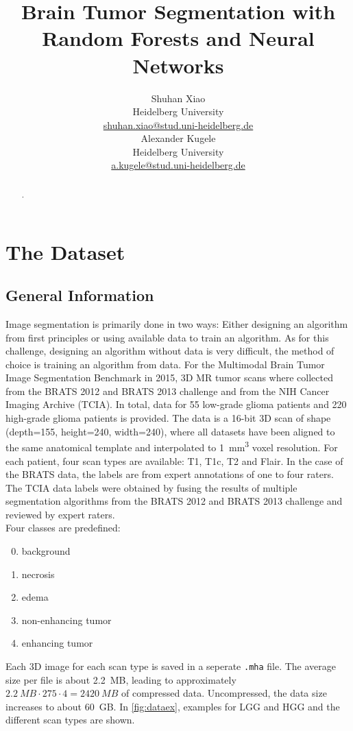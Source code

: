 \documentclass[final]{article}
\title{Brain Tumor Segmentation with Random Forests and Neural Networks}
\author{
  Shuhan Xiao \\
  Heidelberg University \\
  \href{mailto:shuhan.xiao@stud.uni-heidelberg.de}{shuhan.xiao@stud.uni-heidelberg.de}\\
  \And
  Alexander Kugele \\
  Heidelberg University \\
  \href{mailto:a.kugele@stud.uni-heidelberg.de}{a.kugele@stud.uni-heidelberg.de}\\
}
\begin{document}
\maketitle

\begin{abstract}
.
\end{abstract}

\section{The Dataset}

\subsection{General Information}
Image segmentation is primarily done in two ways: Either designing an algorithm
from first principles or using available data to train an algorithm. As for
this challenge, designing an algorithm without data is very difficult, the
method of choice is training an algorithm from data. For the Multimodal Brain
Tumor Image Segmentation Benchmark \citep{BRATS} in 2015, 3D MR tumor scans
where collected from the BRATS 2012 and BRATS 2013 challenge and from the NIH
Cancer Imaging Archive (TCIA). In total, data for 55 low-grade glioma patients
and 220 high-grade glioma patients is provided. The data is a 16-bit 3D scan of
shape (depth=155, height=240, width=240), where all datasets have been aligned
to the same anatomical template and interpolated to \SI{1}{\mm^3} voxel
resolution. For each patient, four scan types are available: T1, T1c, T2 and
Flair. In the case of the BRATS data, the labels are from expert annotations of
one to four raters. The TCIA data labels were obtained by fusing the results of
multiple segmentation algorithms from the BRATS 2012 and BRATS 2013 challenge
and reviewed by expert raters.\\
Four classes are predefined:
\begin{enumerate}[label=\arabic*),topsep=0pt]
  \setcounter{enumi}{-1}
\item background
\item necrosis
\item edema
\item non-enhancing tumor
\item enhancing tumor
\end{enumerate}
Each 3D image for each scan type is saved in a seperate \verb+.mha+ file. The
average size per file is about \SI{2.2}{MB}, leading to approximately
$\SI{2.2}{MB}\cdot 275 \cdot 4 = \SI{2420}{MB}$ of compressed data.
Uncompressed, the data size increases to about \SI{60}{GB}. In
\cref{fig:dataex}, examples for LGG and HGG and the different scan types are
shown.
\end{document}
